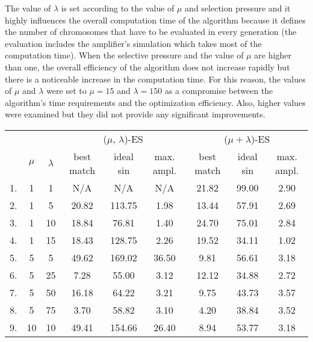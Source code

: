 The value of $\lambda$ is set according to the value of $\mu$ and selection pressure and it highly influences the overall computation time of the algorithm because it defines the number of chromosomes that have to be evaluated in every generation (the evaluation includes the amplifier's simulation which takes most of the computation time). When the selective pressure and the value of $\mu$ are higher than one, the overall efficiency of the algorithm does not increase rapidly but there is a noticeable increase in the computation time. For this reason, the values of $\mu$ and $\lambda$ were set to $\mu = 15$ and $\lambda = 150$ as a compromise between the algorithm's time requirements and the optimization efficiency. Also, higher values were examined but they did not provide any significant improvements.

\begin{table}[H]
\centering
\begin{tabular}{@{}ccccccccc@{}}
\toprule
    &       &           & \multicolumn{3}{c}{($\mu$, $\lambda$)-ES} & \multicolumn{3}{c}{($\mu + \lambda$)-ES} \\
   \cmidrule(lr){4-6} \cmidrule(lr){7-9}
    & $\mu$ & $\lambda$ & best match & ideal sin & max. ampl.       & best match & ideal sin  & max. ampl.     \\
   \midrule
1.  & 1     & 1         & N/A        & N/A       & N/A              & 21.82      & 99.00      & 2.90           \\
2.  & 1     & 5         & 20.82      & 113.75    & 1.98             & 13.44      & 57.91      & 2.69           \\
3.  & 1     & 10        & 18.84      & 76.81     & 1.40             & 24.70      & 75.01      & 2.84           \\
4.  & 1     & 15        & 18.43      & 128.75    & 2.26             & 19.52      & 34.11      & 1.02           \\
5.  & 5     & 5         & 49.62      & 169.02    & 36.50            & 9.81       & 56.61      & 3.18           \\
6.  & 5     & 25        & 7.28       & 55.00     & 3.12             & 12.12      & 34.88      & 2.72           \\
7.  & 5     & 50        & 16.18      & 64.22     & 3.21             & 9.75       & 43.73      & 3.57           \\
8.  & 5     & 75        & 3.70       & 58.82     & 3.10             & 4.20       & 38.84      & 3.52           \\
9.  & 10    & 10        & 49.41      & 154.66    & 26.40            & 8.94       & 53.77      & 3.18           \\

\end{tabular}
\end{table}
